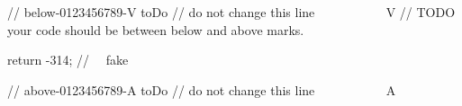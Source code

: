 \noindent\begin{minipage}{\linewidth}   %
\begin{javacode}
// below-0123456789-V toDo  // do not change this line ~~~~~~~~~~ V
// TODO your code should be between below and above marks.

return -314;      // ~~fake~~ 

// above-0123456789-A toDo  // do not change this line ~~~~~~~~~~ A
\end{javacode}
\end{minipage}
